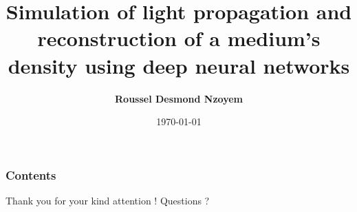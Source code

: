 \documentclass[notes,handout]{beamer}
\begin{document}

\title[Deep learning for inverse problems in radiative transfer]{Simulation of light propagation and reconstruction of a medium's density using deep neural networks}


\author[Roussel Desmond Nzoyem]{\large \bfseries Roussel Desmond Nzoyem}


\date[Soutenance mi-stage 2021]{\today}

\begin{frame}[plain]
  \maketitle  
\end{frame}




\begin{frame}
  \small
  \frametitle{Contents}
  \tableofcontents
\end{frame}




% 

% 

% 

% 




\appendix   %


\tiny
\printbibliography


  \begin{frame}
    \Large
    \begin{exampleblock}{\centering \LARGE Thank you for your kind attention \Large \Smiley{} !}\LARGE
      \centering
      Questions ?
    \end{exampleblock}

  \end{frame}
\end{document}
